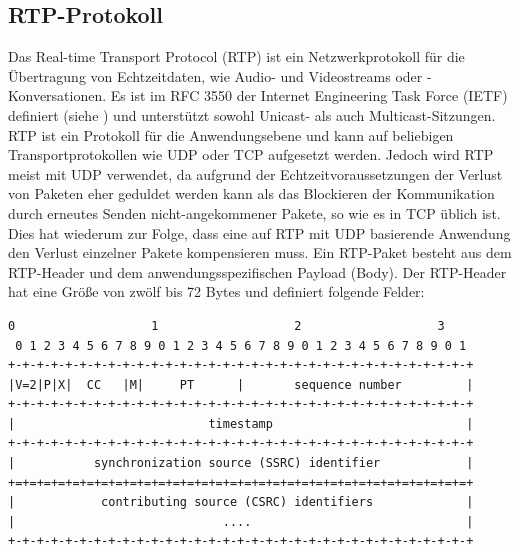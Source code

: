 \subsection{RTP-Protokoll}
\label{rtp}
Das Real-time Transport Protocol (RTP) ist ein Netzwerkprotokoll für die Übertragung von Echtzeitdaten, wie Audio- und Videostreams oder -Konversationen. Es ist im RFC 3550 der Internet Engineering Task Force (IETF) definiert (siehe \cite{RFC3550}) und unterstützt sowohl Unicast- als auch Multicast-Sitzungen. RTP ist ein Protokoll für die Anwendungsebene und kann auf beliebigen Transportprotokollen wie UDP oder TCP aufgesetzt werden. Jedoch wird RTP meist mit UDP verwendet, da aufgrund der Echtzeitvoraussetzungen der Verlust von Paketen eher geduldet werden kann als das Blockieren der Kommunikation durch erneutes Senden nicht-angekommener Pakete, so wie es in TCP üblich ist. Dies hat wiederum zur Folge, dass eine auf RTP mit UDP basierende Anwendung den Verlust einzelner Pakete kompensieren muss. Ein RTP-Paket besteht aus dem RTP-Header und dem anwendungsspezifischen Payload (Body). Der RTP-Header hat eine Größe von zwölf bis 72 Bytes und definiert folgende Felder:
\begin{lstlisting}[keepspaces=true,numbers=none,label=lst=rtpHeader,caption=RTP Header \cite{RFC3550}]
 0                   1                   2                   3
 0 1 2 3 4 5 6 7 8 9 0 1 2 3 4 5 6 7 8 9 0 1 2 3 4 5 6 7 8 9 0 1
+-+-+-+-+-+-+-+-+-+-+-+-+-+-+-+-+-+-+-+-+-+-+-+-+-+-+-+-+-+-+-+-+
|V=2|P|X|  CC   |M|     PT      |       sequence number         |
+-+-+-+-+-+-+-+-+-+-+-+-+-+-+-+-+-+-+-+-+-+-+-+-+-+-+-+-+-+-+-+-+
|                           timestamp                           |
+-+-+-+-+-+-+-+-+-+-+-+-+-+-+-+-+-+-+-+-+-+-+-+-+-+-+-+-+-+-+-+-+
|           synchronization source (SSRC) identifier            |
+=+=+=+=+=+=+=+=+=+=+=+=+=+=+=+=+=+=+=+=+=+=+=+=+=+=+=+=+=+=+=+=+
|            contributing source (CSRC) identifiers             |
|                             ....                              |
+-+-+-+-+-+-+-+-+-+-+-+-+-+-+-+-+-+-+-+-+-+-+-+-+-+-+-+-+-+-+-+-+
\end{lstlisting}
